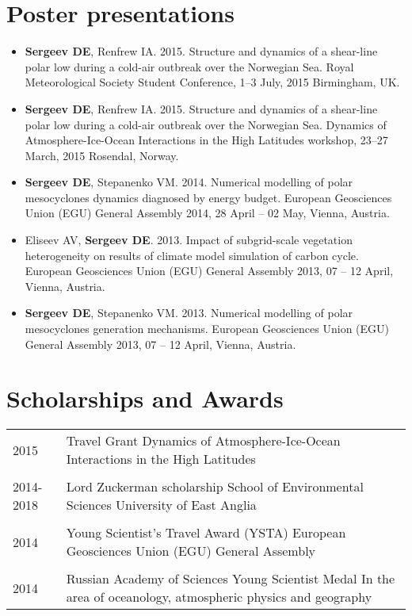 \documentclass[a4paper,11pt]{article}
\newlength{\mycol}
\begin{document}
\section{Poster presentations}
\begin{itemize}
	\item {\bf Sergeev DE}, Renfrew IA. 2015. Structure and dynamics of a shear-line polar low during a cold-air outbreak over the Norwegian Sea. Royal Meteorological Society Student Conference, 1--3 July, 2015 Birmingham, UK.
    \item {\bf Sergeev DE}, Renfrew IA. 2015. Structure and dynamics of a shear-line polar low during a cold-air outbreak over the Norwegian Sea. Dynamics of Atmosphere-Ice-Ocean Interactions in the High Latitudes workshop, 23--27 March, 2015 Rosendal, Norway.
	\item {\bf Sergeev DE}, Stepanenko VM. 2014. Numerical modelling of polar mesocyclones dynamics diagnosed by energy budget. European Geosciences Union (EGU) General Assembly 2014, 28 April -- 02 May, Vienna, Austria.
	\item Eliseev AV, {\bf Sergeev DE}. 2013. Impact of subgrid-scale vegetation heterogeneity on results of climate model simulation of carbon cycle. European Geosciences Union (EGU) General Assembly 2013, 07 -- 12 April, Vienna, Austria.
	\item {\bf Sergeev DE}, Stepanenko VM. 2013. Numerical modelling of polar mesocyclones generation mechanisms. European Geosciences Union (EGU) General Assembly 2013, 07 -- 12 April, Vienna, Austria.
\end{itemize}

      
\section{Scholarships and Awards}
\begin{tabu} to 
 \textsc{2015} & Travel Grant 
                  \newline Dynamics of Atmosphere-Ice-Ocean Interactions in the High Latitudes \\
  \\
 \textsc{2014-2018} & Lord Zuckerman scholarship
                    \newline School of Environmental Sciences
                    \newline University of East Anglia \\
  \\
 \textsc{2014} & Young Scientist's Travel Award (YSTA)
                 \newline European Geosciences Union (EGU) General Assembly \\
  \\
 \textsc{2014} & Russian Academy of Sciences Young Scientist Medal
                 \newline In the area of oceanology, atmospheric physics and geography
\end{tabu}
\end{document}
